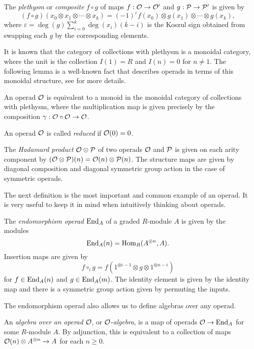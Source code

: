 \documentclass[Thesis.tex]{subfiles}
\begin{document}
\begin{defin}
The \emph{plethysm} or \emph{composite} $f\circ g$ of maps $f:{\mathcal O}\to{\mathcal O}'$ and $g:\mathcal{P}\to\mathcal{P}'$ is given by
\[(f\circ g)(x_0\otimes x_1\otimes\cdots\otimes x_k)=(-1)^{\varepsilon} f(x_0)\otimes g(x_1)\otimes\cdots\otimes g(x_k),\]
where $\varepsilon = \deg(g)\sum_{i=0}^k\deg(x_i)(k-i)$ is the Koszul sign obtained from swapping each $g$ by the corresponding elements. 
\end{defin}


It is known that the category of collections with plethysm is a monoidal category, where the unit is the collection $I(1)=R$ and $I(n)=0$ for $n\neq 1$. The following lemma is a well-known fact that describes operads in terms of this monoidal structure, see \cite[\S 5]{lodayvallette} for more details. 
\begin{lem}\label{monoid}
An operad ${\mathcal O}$ is equivalent to a monoid in the monoidal category of collections with plethysm, where the multiplication map is given precisely by the composition $\gamma:{\mathcal O}\circ{\mathcal O}\to{\mathcal O}$. 
\end{lem}


\begin{defin} An operad ${\mathcal O}$ is called \emph{reduced} if ${\mathcal O}(0)=0$.\end{defin}

\begin{defin}The \emph{Hadamard product} ${\mathcal O}\otimes\mathcal{P}$ of  two operads ${\mathcal O}$ and $\mathcal{P}$ is given on each arity component by $({\mathcal O}\otimes\mathcal{P})(n)={\mathcal O}(n)\otimes\mathcal{P}(n)$. The structure maps are given by diagonal composition and diagonal symmetric group action in the case of symmetric operads. \end{defin}

The next definition is the most important and common example of an operad. It is very useful to keep it in mind when intuitively thinking about operads.

\begin{defin}
The \emph{endomorphism operad} $\operatorname{End}_A$ of a graded $R$-module $A$ is given by the modules \[\operatorname{End}_A(n)=\operatorname{Hom}_R(A^{\otimes n},A).\] Insertion maps are given by
\[f\circ_i g=f(1^{\otimes i-1}\otimes g\otimes 1^{\otimes n-i})\]
for $f\in\operatorname{End}_A(n)$ and $g\in\operatorname{End}_A(m)$. The identity element is given by the identity map and there is a symmetric group action given by permuting the inputs.
\end{defin}
The endomorphism operad also allows us to define algebras over any operad.
\begin{defin}
An \emph{algebra over an operad} ${\mathcal O}$, or ${\mathcal O}$-\emph{algebra}, is a map of operads ${\mathcal O}\to\operatorname{End}_A$ for some $R$-module $A$. By adjunction, this is equivalent to a collection of maps ${\mathcal O}(n)\otimes A^{\otimes n}\to A$ for each $n\geq 0$.  
\end{defin}
\end{document}
